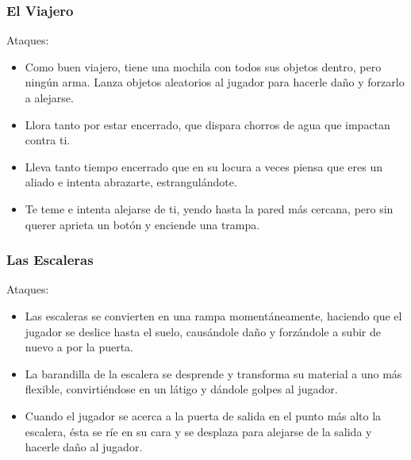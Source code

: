 \subsubsection{El Viajero}


Ataques:
\begin{itemize}
    \item Como buen viajero, tiene una mochila con todos sus objetos dentro,
    pero ningún arma. Lanza objetos aleatorios al jugador para hacerle daño y forzarlo a
    alejarse.
    \item Llora tanto por estar encerrado, que dispara chorros de agua que
    impactan contra ti.
    \item Lleva tanto tiempo encerrado que en su locura a veces piensa que eres
    un aliado e intenta abrazarte, estrangulándote.
    \item Te teme e intenta alejarse de ti, yendo hasta la pared más cercana,
    pero sin querer aprieta un botón y enciende una trampa.
\end{itemize}


\subsubsection{Las Escaleras}


Ataques:
\begin{itemize}
    \item Las escaleras se convierten en una rampa momentáneamente, haciendo que
    el jugador se deslice hasta el suelo, causándole daño y forzándole a subir
    de nuevo a por la puerta.
    \item La barandilla de la escalera se desprende y transforma su material a
    uno más flexible, convirtiéndose en un látigo y dándole golpes al jugador.
    \item Cuando el jugador se acerca a la puerta de salida en el punto más alto
    la escalera, ésta se ríe en su cara y se desplaza para alejarse de la salida
    y hacerle daño al jugador.
\end{itemize}


